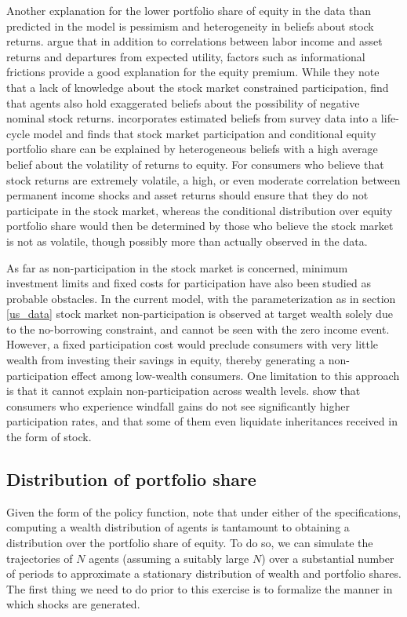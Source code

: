 Another explanation for the lower portfolio share of equity in the data than predicted in the model is pessimism and heterogeneity in beliefs about stock returns. \citet{Haliassos1995} argue that in addition to correlations between labor income and asset returns and departures from expected utility, factors such as informational frictions provide a good explanation for the equity premium. While they note that a lack of knowledge about the stock market constrained participation, \citet{Dominitz2007} find that agents also hold exaggerated beliefs about the possibility of negative nominal stock returns. \citet{Mateo2024} incorporates estimated beliefs from survey data into a life-cycle model and finds that stock market participation and conditional equity portfolio share can be explained by heterogeneous beliefs with a high average belief about the volatility of returns to equity. For consumers who believe that stock returns are extremely volatile, a high, or even moderate correlation between permanent income shocks and asset returns should ensure that they do not participate in the stock market, whereas the conditional distribution over equity portfolio share would then be determined by those who believe the stock market is not as volatile, though possibly more than actually observed in the data.

As far as non-participation in the stock market is concerned, minimum investment limits and fixed costs for participation have also been studied as probable obstacles. In the current model, with the parameterization as in section \ref{us_data} stock market non-participation is observed at target wealth solely due to the no-borrowing constraint, and cannot be seen with the zero income event. However, a fixed participation cost would preclude consumers with very little wealth from investing their savings in equity, thereby generating a non-participation effect among low-wealth consumers. One limitation to this approach is that it cannot explain non-participation across wealth levels. \citet{Andersen2011,Briggs2021} show that consumers who experience windfall gains do not see significantly higher participation rates, and that some of them even liquidate inheritances received in the form of stock.

\subsection{Distribution of portfolio share}

Given the form of the policy function, note that under either of the specifications, computing a wealth distribution of agents is tantamount to obtaining a distribution over the portfolio share of equity. To do so, we can simulate the trajectories of $N$ agents (assuming a suitably large $N$) over a substantial number of periods to approximate a stationary distribution of wealth and portfolio shares. The first thing we need to do prior to this exercise is to formalize the manner in which shocks are generated.

